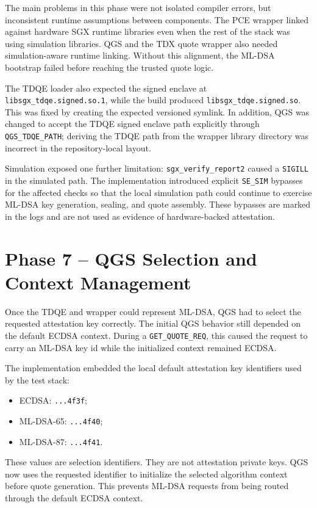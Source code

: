 The main problems in this phase were not isolated compiler errors, but
inconsistent runtime assumptions between components. The PCE wrapper linked
against hardware SGX runtime libraries even when the rest of the stack was
using simulation libraries. QGS and the TDX quote wrapper also needed
simulation-aware runtime linking. Without this alignment, the ML-DSA bootstrap
failed before reaching the trusted quote logic.

The TDQE loader also expected the signed enclave at
\texttt{libsgx\_tdqe.signed.so.1}, while the build produced
\texttt{libsgx\_tdqe.signed.so}. This was fixed by creating the expected
versioned symlink. In addition, QGS was changed to accept the TDQE signed
enclave path explicitly through \texttt{QGS\_TDQE\_PATH}; deriving the TDQE
path from the wrapper library directory was incorrect in the repository-local
layout.

Simulation exposed one further limitation: \texttt{sgx\_verify\_report2}
caused a \texttt{SIGILL} in the simulated path. The implementation introduced
explicit \texttt{SE\_SIM} bypasses for the affected checks so that the local
simulation path could continue to exercise ML-DSA key generation, sealing, and
quote assembly. These bypasses are marked in the logs and are not used as
evidence of hardware-backed attestation.

\section{Phase 7 -- QGS Selection and Context Management}

Once the TDQE and wrapper could represent ML-DSA, QGS had to select the
requested attestation key correctly. The initial QGS behavior still depended
on the default ECDSA context. During a \texttt{GET\_QUOTE\_REQ}, this caused
the request to carry an ML-DSA key id while the initialized context remained
ECDSA.

The implementation embedded the local default attestation key identifiers used
by the test stack:

\begin{itemize}
  \item ECDSA: \texttt{...4f3f};
  \item ML-DSA-65: \texttt{...4f40};
  \item ML-DSA-87: \texttt{...4f41}.
\end{itemize}

These values are selection identifiers. They are not attestation private keys.
QGS now uses the requested identifier to initialize the selected algorithm
context before quote generation. This prevents ML-DSA requests from being
routed through the default ECDSA context.

